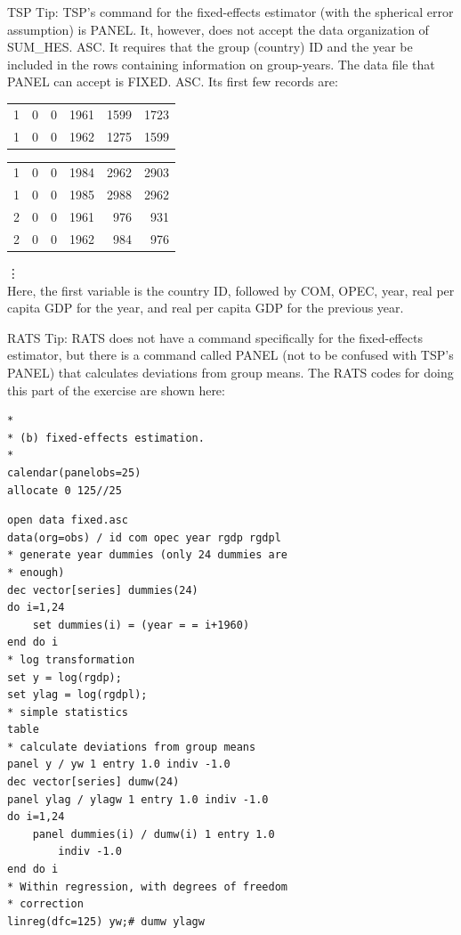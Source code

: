 \documentclass[10pt]{article}
\begin{document}
TSP Tip: TSP's command for the fixed-effects estimator (with the spherical error assumption) is PANEL. It, however, does not accept the data organization of SUM\_HES. ASC. It requires that the group (country) ID and the year be included in the rows containing information on group-years. The data file that PANEL can accept is FIXED. ASC. Its first few records are:

\begin{center}
\begin{tabular}{llllll}
1 & 0 & 0 & 1961 & 1599 & 1723 \\
1 & 0 & 0 & 1962 & 1275 & 1599 \\
\end{tabular}
\end{center}

\begin{center}
\begin{tabular}{rrrrrr}
1 & 0 & 0 & 1984 & 2962 & 2903 \\
1 & 0 & 0 & 1985 & 2988 & 2962 \\
2 & 0 & 0 & 1961 & 976 & 931 \\
2 & 0 & 0 & 1962 & 984 & 976 \\
\end{tabular}
\end{center}

⋮\\
Here, the first variable is the country ID, followed by COM, OPEC, year, real per capita GDP for the year, and real per capita GDP for the previous year.

RATS Tip: RATS does not have a command specifically for the fixed-effects estimator, but there is a command called PANEL (not to be confused with TSP's PANEL) that calculates deviations from group means. The RATS codes for doing this part of the exercise are shown here:

\begin{verbatim}
*
* (b) fixed-effects estimation.
*
calendar(panelobs=25)
allocate 0 125//25
\end{verbatim}

\begin{verbatim}
open data fixed.asc
data(org=obs) / id com opec year rgdp rgdpl
* generate year dummies (only 24 dummies are
* enough)
dec vector[series] dummies(24)
do i=1,24
    set dummies(i) = (year = = i+1960)
end do i
* log transformation
set y = log(rgdp);
set ylag = log(rgdpl);
* simple statistics
table
* calculate deviations from group means
panel y / yw 1 entry 1.0 indiv -1.0
dec vector[series] dumw(24)
panel ylag / ylagw 1 entry 1.0 indiv -1.0
do i=1,24
    panel dummies(i) / dumw(i) 1 entry 1.0
        indiv -1.0
end do i
* Within regression, with degrees of freedom
* correction
linreg(dfc=125) yw;# dumw ylagw
\end{verbatim}
\end{document}
